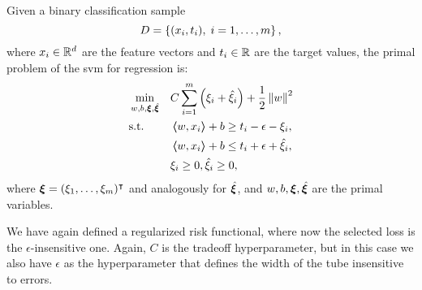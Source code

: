 \begin{definition}
    Given a binary classification sample
    $$ D = \left\{(x_i, t_i), \; i=1, \ldots, m\right\} ,$$
    where $x_i \in \mathbb{R}^d$ are the feature vectors and $t_i \in \mathbb{R}$ are the target values, 
    the primal problem of the \acrshort{svm} for regression is:
    \begin{equation}
        \label{eq:linear_primal_reg}
        \begin{aligned}
            &\min_{w, b, \fv{\xi}, \hat{\fv{\xi}}} & & C \sum_{i=1}^m \left(\xi_i + \hat{\xi}_i\right) + \frac{1}{2} \norm{w}^2 \\
            & \text{s.t.} & & \dotp{w}{x_i} + b \geq t_i - \epsilon - \xi_i  , \\
            & & & \dotp{w}{x_i} + b \leq t_i + \epsilon + \hat{\xi}_i , \\
            & & & \xi_i \geq 0 , \hat{\xi}_i \geq 0 ,      
        \end{aligned}  
    \end{equation}
    where $\bm{\xi} = (\xi_1, \ldots, \xi_m)^\intercal$ and analogously for $\hat{\bm{\xi}}$, and $w, b, \bm{\xi}, \hat{\bm{\xi}}$ are the primal variables.
\end{definition}
We have again defined a regularized risk functional, where now the selected loss is the $\epsilon$-insensitive one. Again, $C$ is the tradeoff hyperparameter, but in this case we also have $\epsilon$ as the hyperparameter that defines the width of the tube insensitive to errors.

